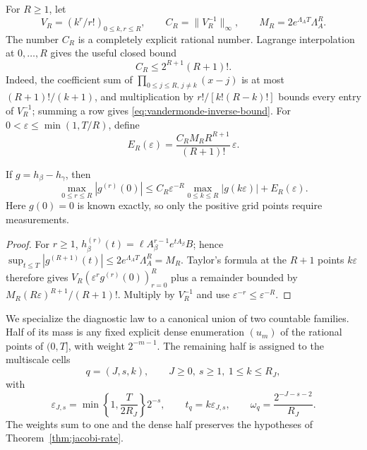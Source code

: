 For \(R\ge1\), let
\[
 V_R=(k^r/r!)_{0\le k,r\le R},
 \qquad C_R=\|V_R^{-1}\|_\infty,
 \qquad M_R=2e^{\Lambda_AT}\Lambda_A^R.
\]
The number \(C_R\) is a completely explicit rational number.  Lagrange
interpolation at \(0,\ldots,R\) gives the useful closed bound
\begin{equation}
 C_R\le 2^{R+1}(R+1)!.
 \label{eq:vandermonde-inverse-bound}
\end{equation}
Indeed, the coefficient sum of
\(\prod_{0\le j\le R,\,j\ne k}(x-j)\) is at most
\((R+1)!/(k+1)\), and multiplication by
\(r!/[k!(R-k)!]\) bounds every entry of \(V_R^{-1}\); summing a row gives
\eqref{eq:vandermonde-inverse-bound}.  For
\(0<\varepsilon\le\min(1,T/R)\), define
\begin{equation}
 E_R(\varepsilon)=
 \frac{C_RM_RR^{R+1}}{(R+1)!}\,\varepsilon.
 \label{eq:taylor-grid-error}
\end{equation}

\begin{lemma}
\label{lem:finite-grid-certificate}
If \(g=h_\beta-h_\gamma\), then
\begin{equation}
 \max_{0\le r\le R}|g^{(r)}(0)|
 \le C_R\varepsilon^{-R}
       \max_{0\le k\le R}|g(k\varepsilon)|
       +E_R(\varepsilon).
 \label{eq:finite-grid-derivative}
\end{equation}
Here \(g(0)=0\) is known exactly, so only the positive grid points require
measurements.
\end{lemma}

\begin{proof}
For \(r\ge1\),
\(h_\beta^{(r)}(t)=\ell A_\beta^{r-1}e^{tA_\beta}B\); hence
\(\sup_{t\le T}|g^{(R+1)}(t)|\le
2e^{\Lambda_AT}\Lambda_A^R=M_R\).  Taylor's formula at the \(R+1\)
points \(k\varepsilon\) therefore gives
\(V_R(\varepsilon^rg^{(r)}(0))_{r=0}^R\) plus a remainder bounded by
\(M_R(R\varepsilon)^{R+1}/(R+1)!\).  Multiply by \(V_R^{-1}\) and use
\(\varepsilon^{-r}\le\varepsilon^{-R}\).
\end{proof}

We specialize the diagnostic law to a canonical union of two countable
families.  Half of its mass is any fixed explicit dense enumeration
\((u_m)\) of the rational points of \((0,T]\), with weight \(2^{-m-1}\).
The remaining half is assigned to the multiscale cells
\[
 q=(J,s,k),\qquad J\ge0,\ s\ge1,\ 1\le k\le R_J,
\]
with
\begin{equation}
 \varepsilon_{J,s}=\min\left\{1,\frac{T}{2R_J}\right\}2^{-s},\qquad
 t_q=k\varepsilon_{J,s},\qquad
 \omega_q=\frac{2^{-J-s-2}}{R_J}.
 \label{eq:multiscale-design}
\end{equation}
The weights sum to one and the dense half preserves the hypotheses of
Theorem~\ref{thm:jacobi-rate}.

